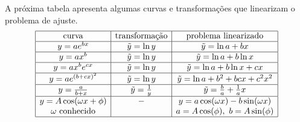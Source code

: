 A próxima tabela apresenta algumas curvas e transformações que linearizam o problema de ajuste.
$$
\begin{array}{|c|c|c|}   \hline
\hbox{curva}    &\hbox{transformação}&\hbox{problema linearizado}\\ \hline
y=ae^{bx}       &\tilde y=\ln y       & \tilde y=\ln a+ bx\\ \hline
y=ax^b          &\tilde y=\ln y       & \tilde y=\ln a+ b\ln x\\ \hline
y=ax^be^{cx}    &\tilde y=\ln y       & \tilde y=\ln a+ b\ln x+cx\\ \hline
y=ae^{(b+cx)^2} &\tilde y=\ln y       & \tilde y=\ln a+b^2+ bc x+c^2x^2\\ \hline
y=\frac{a}{b+x} &\tilde y=\frac{1}{y} & \tilde y=\frac{b}{a}+\frac{1}{a}x\\ \hline
y=A\cos(\omega x+\phi)   & - &  y=a\cos(\omega x)-b\sin(\omega x) \\
\omega\ \hbox{conhecido} &   &  a=A\cos(\phi),\ b=A\sin(\phi) \\ \hline
\end{array}
$$

